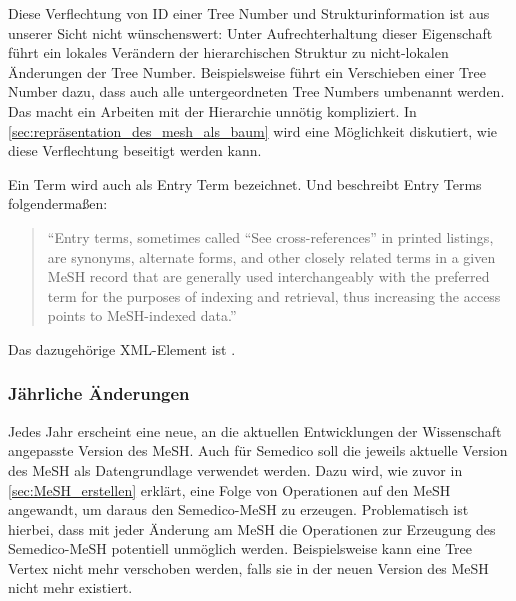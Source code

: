 Diese Verflechtung von ID einer Tree Number und Strukturinformation ist aus unserer Sicht nicht wünschenswert: Unter Aufrechterhaltung dieser Eigenschaft führt ein lokales Verändern der hierarchischen Struktur zu nicht-lokalen Änderungen der Tree Number. Beispielsweise führt ein Verschieben einer Tree Number dazu, dass auch alle untergeordneten Tree Numbers umbenannt werden. Das macht ein Arbeiten mit der Hierarchie unnötig kompliziert. In \autoref{sec:repräsentation_des_mesh_als_baum} wird eine Möglichkeit diskutiert, wie diese Verflechtung beseitigt werden kann. \par

Ein Term wird auch als Entry Term bezeichnet. Und \cite{MeSHEntryTerms2012} beschreibt Entry Terms folgendermaßen:
\begin{quotation}
"`Entry terms, sometimes called "`See cross-references"' in printed listings, are synonyms, alternate forms, and other closely related terms in a given MeSH record that are generally used interchangeably with the preferred term for the purposes of indexing and retrieval, thus increasing the access points to MeSH-indexed data."'
\end{quotation}

Das dazugehörige XML-Element ist  . 


\subsubsection{Jährliche Änderungen}
\label{sec:anual_changes}
Jedes Jahr erscheint eine neue, an die aktuellen Entwicklungen der Wissenschaft angepasste Version des MeSH. Auch für Semedico soll die jeweils aktuelle Version des MeSH als Datengrundlage verwendet werden. Dazu wird, wie zuvor in \autoref{sec:MeSH_erstellen} erklärt, eine Folge von Operationen auf den MeSH angewandt, um daraus den Semedico-MeSH zu erzeugen. Problematisch ist hierbei, dass mit jeder Änderung am MeSH die Operationen zur Erzeugung des Semedico-MeSH potentiell unmöglich werden. Beispielsweise kann eine Tree Vertex nicht mehr verschoben werden, falls sie in der neuen Version des MeSH nicht mehr existiert.\par

